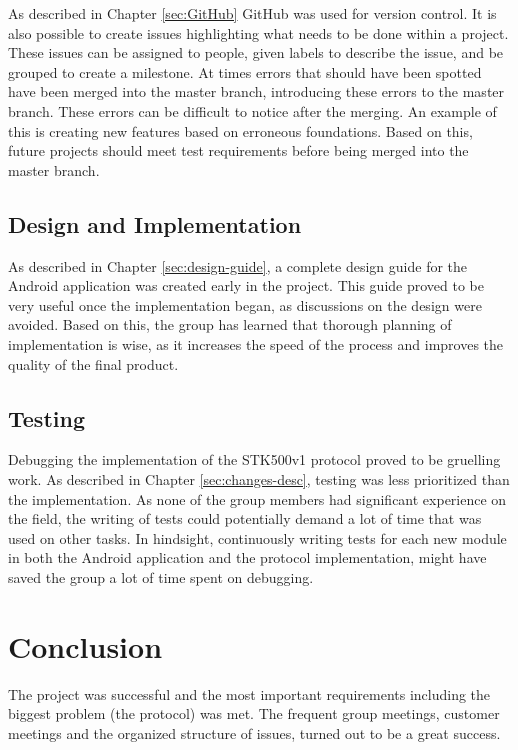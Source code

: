 	As described in Chapter \ref{sec:GitHub} GitHub was used for version control. It is also possible to create issues highlighting what needs to be done within a project. These issues can be assigned to people, given labels to describe the issue, and be grouped to create a milestone. At times errors that should have been spotted have been merged into the master branch, introducing these errors to the master branch. These errors can be difficult to notice after the merging. An example of this is creating new features based on erroneous foundations. Based on this, future projects should meet test requirements before being merged into the master branch. \\

	\subsection{Design and Implementation}
	As described in Chapter \ref{sec:design-guide}, a complete design guide for the Android application was created early in the project. This guide proved to be very useful once the implementation began, as discussions on the design were avoided. Based on this, the group has learned that thorough planning of implementation is wise, as it increases the speed of the process and improves the quality of the final product.

	\subsection{Testing}
	Debugging the implementation of the STK500v1 protocol proved to be gruelling work. As described in Chapter \ref{sec:changes-desc}, testing was less prioritized than the implementation. As none of the group members had significant experience on the field, the writing of tests could potentially demand a lot of time that was used on other tasks. In hindsight, continuously writing tests for each new module in both the Android application and the protocol implementation, might have saved the group a lot of time spent on debugging.

	\section{Conclusion}


    The project was successful and the most important requirements including the biggest problem (the protocol) was met. The frequent group meetings, customer meetings and the organized structure of issues, turned out to be a great success. \\

